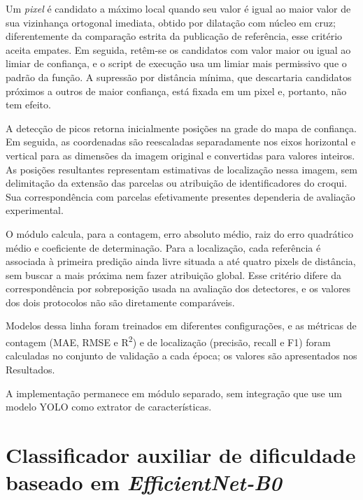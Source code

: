 Um \textit{pixel} \'e candidato a m\'aximo local quando seu valor \'e igual ao maior valor de sua vizinhan\c{c}a ortogonal imediata, obtido por dilata\c{c}\~ao com n\'ucleo em cruz; diferentemente da compara\c{c}\~ao estrita da publica\c{c}\~ao de refer\^encia, esse crit\'erio aceita empates. Em seguida, ret\^em-se os candidatos com valor maior ou igual ao limiar de confian\c{c}a, e o script de execu\c{c}\~ao usa um limiar mais permissivo que o padr\~ao da fun\c{c}\~ao. A supress\~ao por dist\^ancia m\'inima, que descartaria candidatos pr\'oximos a outros de maior confian\c{c}a, est\'a fixada em um pixel e, portanto, n\~ao tem efeito.

A detec\c{c}\~ao de picos retorna inicialmente posi\c{c}\~oes na grade do mapa de confian\c{c}a. Em seguida, as coordenadas s\~ao reescaladas separadamente nos eixos horizontal e vertical para as dimens\~oes da imagem original e convertidas para valores inteiros. As posi\c{c}\~oes resultantes representam estimativas de localiza\c{c}\~ao nessa imagem, sem delimita\c{c}\~ao da extens\~ao das parcelas ou atribui\c{c}\~ao de identificadores do croqui. Sua correspond\^encia com parcelas efetivamente presentes dependeria de avalia\c{c}\~ao experimental.

O m\'odulo calcula, para a contagem, erro absoluto m\'edio, raiz do erro quadr\'atico m\'edio e coeficiente de determina\c{c}\~ao. Para a localiza\c{c}\~ao, cada refer\^encia \'e associada \`a primeira predi\c{c}\~ao ainda livre situada a at\'e quatro pixels de dist\^ancia, sem buscar a mais pr\'oxima nem fazer atribui\c{c}\~ao global. Esse crit\'erio difere da correspond\^encia por sobreposi\c{c}\~ao usada na avalia\c{c}\~ao dos detectores, e os valores dos dois protocolos n\~ao s\~ao diretamente compar\'aveis.

Modelos dessa linha foram treinados em diferentes configura\c{c}\~oes, e as m\'etricas de contagem (MAE, RMSE e R\textsuperscript{2}) e de localiza\c{c}\~ao (precis\~ao, recall e F1) foram calculadas no conjunto de valida\c{c}\~ao a cada \'epoca; os valores s\~ao apresentados nos Resultados.

A implementa\c{c}\~ao permanece em m\'odulo separado, sem integra\c{c}\~ao que use um modelo YOLO como extrator de caracter\'isticas.

\section{Classificador auxiliar de dificuldade baseado em \textit{EfficientNet-B0}}
\label{sec:classificador-auxiliar-efficientnet}

